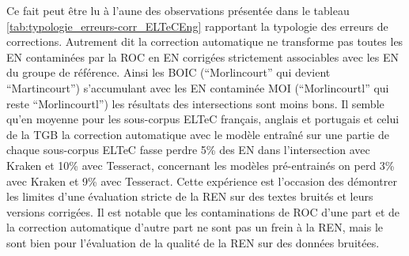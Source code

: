 Ce fait peut être lu à l'aune %
des observations présentée dans le tableau \ref{tab:typologie_erreurs-corr_ELTeCEng} rapportant la typologie des erreurs de corrections. Autrement dit la correction automatique ne transforme pas toutes les EN contaminées par la ROC en EN corrigées strictement associables avec les EN du groupe de référence. Ainsi les BOIC (``Morlincourt'' qui devient ``Martincourt'') s'accumulant avec les EN contaminée MOI (``Morlincourtl'' qui reste ``Morlincourtl'') les résultats des intersections sont moins bons. Il semble qu'en moyenne pour les sous-corpus ELTeC français, anglais et portugais et celui de la TGB la correction automatique avec le modèle entraîné sur une partie de chaque sous-corpus ELTeC fasse perdre 5\% des EN dans l'intersection avec Kraken et 10\% avec Tesseract, concernant les modèles pré-entrainés on perd 3\% avec Kraken et 9\% avec Tesseract. Cette expérience est l'occasion des démontrer les limites d'une évaluation stricte de la REN sur des textes bruités et leurs versions corrigées. Il est notable que les contaminations de ROC d'une part et de la correction automatique d'autre part ne sont pas un frein à la REN, mais le sont bien pour l'évaluation de la qualité de la REN sur des données bruitées.


